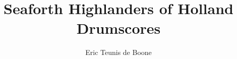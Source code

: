\documentclass{tex/score_book}
\title{Seaforth Highlanders of Holland\\Drumscores}
\author{Eric Teunis de Boone}
\begin{document}


\newpage
\cleardoublepage
{}
{}
\begin{multicols}{2}
  \tableofcontents
\end{multicols}

%
\newpage

\end{document}
